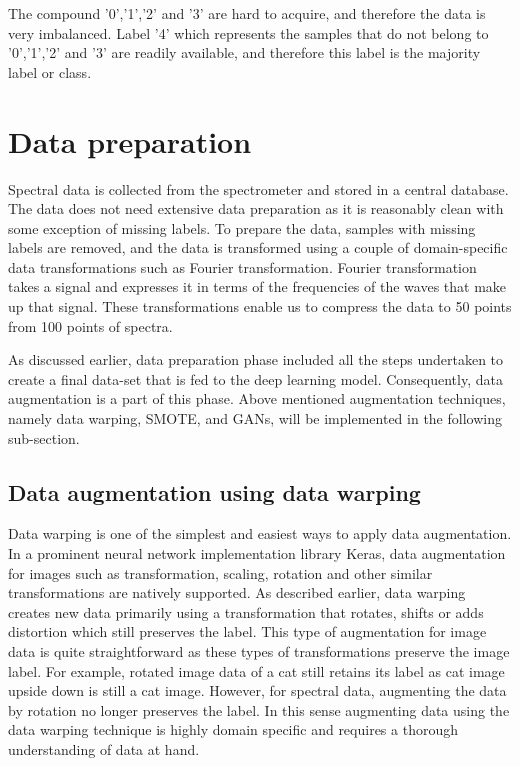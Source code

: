 The compound '0','1','2' and '3' are hard to acquire, and therefore the data is very imbalanced. Label '4' which represents the samples that do not belong to '0','1','2' and '3' are readily available, and therefore this label is the majority label or class.

\section{Data preparation}

 Spectral data is collected from the spectrometer and stored in a central database. The data does not need extensive data preparation as it is reasonably clean with some exception of missing labels. To prepare the data, samples with missing labels are removed, and the data is transformed using a couple of domain-specific data transformations such as Fourier transformation. Fourier transformation takes a signal and expresses it in terms of the frequencies of the waves that make up that signal. These transformations enable us to compress the data to 50 points from 100 points of spectra.

As discussed earlier, data preparation phase included all the steps undertaken to create a final data-set that is fed to the deep learning model. Consequently, data augmentation is a part of this phase. Above mentioned augmentation techniques, namely data warping, SMOTE, and GANs, will be implemented in the following sub-section.

\subsection{Data augmentation using data warping}
Data warping is one of the simplest and easiest ways to apply data augmentation. In a prominent neural network implementation library Keras, data augmentation for images such as transformation, scaling, rotation and other similar transformations are natively supported. As described earlier, data warping creates new data primarily using a transformation that rotates, shifts or adds distortion which still preserves the label. This type of augmentation for image data is quite straightforward as these types of transformations preserve the image label. For example, rotated image data of a cat still retains its label as cat image upside down is still a cat image. However, for spectral data, augmenting the data by rotation no longer preserves the label. In this sense augmenting data using the data warping technique is highly domain specific and requires a thorough understanding of data at hand.

